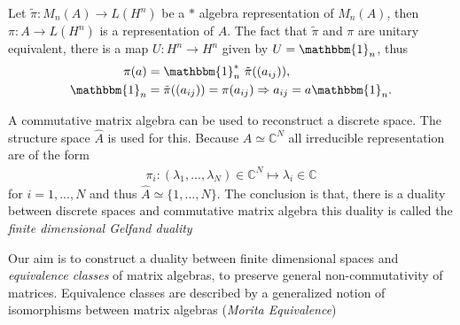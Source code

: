     Let $\tilde{\pi}:M_n(A) \rightarrow L(H^n)$ be a $*$ algebra
    representation of $M_n(A)$, then $\pi: A \rightarrow L(H^n)$ is a representation of $A$.
    The fact that $\tilde{\pi}$ and $\pi$ are unitary equivalent, there is
    a map $U: H^n \rightarrow H^n$ given by $U=\mathbbm{1}_n$, thus
    \begin{align}
        \pi (a) &= \mathbbm{1}_n^*\ \tilde{\pi}((a_{ij})), \\
        \mathbbm{1}_n &= \tilde{\pi}((a_{ij})) = \pi (a_{ij})
    \Rightarrow a_{ij} = a\mathbbm{1}_n.
    \end{align}


A commutative matrix algebra can be used to reconstruct a discrete space.
The structure space $\hat{A}$ is used for this. Because $A \simeq
\mathbb{C}^N$ all
irreducible representation are of the form
\begin{align}
   \pi _i:(\lambda_1,...,\lambda_N)\in \mathbb{C}^N \mapsto \lambda_i \in
   \mathbb{C}
\end{align}
for $i = 1,...,N$ and thus $\hat{A} \simeq \{1,...,N\}$.
The conclusion is that, there is a duality between discrete spaces and
commutative matrix algebra this duality is called the \textit{finite
dimensional Gelfand duality}

Our aim is to construct a duality between finite dimensional spaces and
\textit{equivalence classes} of matrix algebras, to preserve general
non-commutativity of matrices.  Equivalence classes are described by a
generalized notion of isomorphisms between matrix algebras (\textit{Morita
Equivalence})

